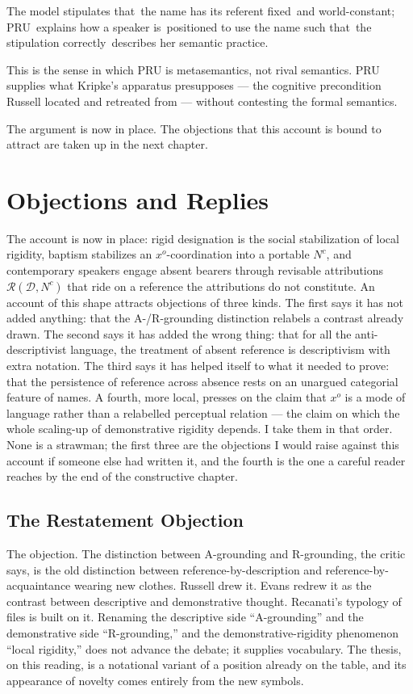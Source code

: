 \documentclass[12pt,a4paper]{article}
\begin{document}
The model stipulates that~the name has its referent fixed~and world-constant; PRU~explains how a speaker is~positioned to use the name such that~the stipulation correctly~describes her semantic practice.

This is the sense in which PRU is metasemantics, not rival semantics. PRU supplies what Kripke's apparatus presupposes --- the cognitive precondition Russell located and retreated from --- without contesting the formal semantics.

The argument is now in place. The objections that this account is bound to attract are taken up in the next chapter.

\section{Objections and Replies}\label{objections-and-replies}

The account is now in place: rigid designation is the social stabilization of local rigidity, baptism stabilizes an \(x^o\)-coordination into a portable \(N^c\), and contemporary speakers engage absent bearers through revisable attributions \(\mathcal{R}(\mathcal{D}, N^c)\) that ride on a reference the attributions do not constitute. An account of this shape attracts objections of three kinds. The first says it has not added anything: that the A-/R-grounding distinction relabels a contrast already drawn. The second says it has added the wrong thing: that for all the anti-descriptivist language, the treatment of absent reference is descriptivism with extra notation. The third says it has helped itself to what it needed to prove: that the persistence of reference across absence rests on an unargued categorial feature of names. A fourth, more local, presses on the claim that \(x^o\) is a mode of language rather than a relabelled perceptual relation --- the claim on which the whole scaling-up of demonstrative rigidity depends. I take them in that order. None is a strawman; the first three are the objections I would raise against this account if someone else had written it, and the fourth is the one a careful reader reaches by the end of the constructive chapter.

\subsection{The Restatement Objection}\label{the-restatement-objection}

The objection. The distinction between A-grounding and R-grounding, the critic says, is the old distinction between reference-by-description and reference-by-acquaintance wearing new clothes. Russell drew it. Evans redrew it as the contrast between descriptive and demonstrative thought. Recanati's typology of files is built on it. Renaming the descriptive side ``A-grounding'' and the demonstrative side ``R-grounding,'' and the demonstrative-rigidity phenomenon ``local rigidity,'' does not advance the debate; it supplies vocabulary. The thesis, on this reading, is a notational variant of a position already on the table, and its appearance of novelty comes entirely from the new symbols.
\end{document}

